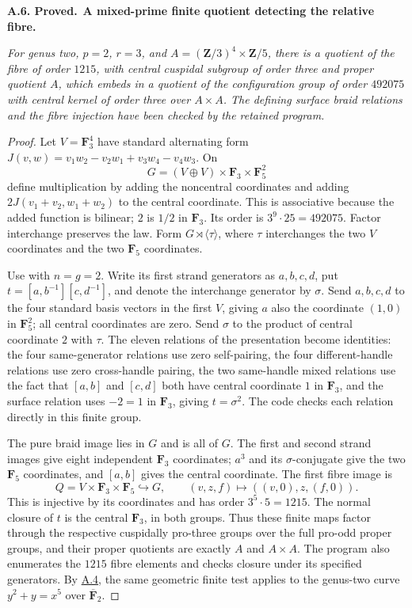 \documentclass[11pt,a4paper]{article}
\newcommand{\Z}{\mathbf Z}
\newcommand{\F}{\mathbf F}
\newenvironment{claim}[3]{\par\medskip\noindent\hypertarget{#1}{\textbf{#1. #2.}}\ \textbf{#3.}\par\nopagebreak\smallskip\begingroup\itshape}{\endgroup\par\smallskip}
\newcommand{\statementref}[1]{\hyperlink{#1}{#1}}
\begin{document}
\begin{claim}{A.6}{Proved}{A mixed-prime finite quotient detecting the relative fibre}
For genus two, $p=2$, $r=3$, and
$A=(\Z/3)^4\times\Z/5$, there is a quotient of the fibre of
order $1215$, with central cuspidal subgroup of order three and proper
quotient $A$, which embeds in a quotient of the configuration group of
order $492075$ with central kernel of order three over $A\times A$.
The defining surface braid relations and the fibre injection have been
checked by the retained program.
\end{claim}
\begin{proof}
Let $V=\F_3^4$ have standard alternating form
$J(v,w)=v_1w_2-v_2w_1+v_3w_4-v_4w_3$. On
\[
 G=(V\oplus V)\times\F_3\times\F_5^2
\]
define multiplication by adding the noncentral coordinates and adding
$2J(v_1+v_2,w_1+w_2)$ to the central coordinate. This is associative
because the added function is bilinear; $2$ is $1/2$ in $\F_3$.
Its order is $3^9\cdot25=492075$. Factor interchange preserves the
law. Form $G\rtimes\langle\tau\rangle$, where $\tau$ interchanges
the two $V$ coordinates and the two $\F_5$ coordinates.

Use \citet[Theorem 1.2]{Bellingeri2004} with $n=g=2$. Write its first
strand generators as $a,b,c,d$, put
$t=[a,b^{-1}][c,d^{-1}]$, and denote the interchange generator by
$\sigma$. Send $a,b,c,d$ to the four standard basis vectors in the
first $V$, giving $a$ also the coordinate $(1,0)$ in $\F_5^2$;
all central coordinates are zero. Send $\sigma$ to the product of
central coordinate $2$ with $\tau$. The eleven relations of the
presentation become identities: the four same-generator relations
use zero self-pairing, the four different-handle relations use zero
cross-handle pairing, the two same-handle mixed relations use the fact that
$[a,b]$ and $[c,d]$ both have central coordinate $1$ in $\F_3$,
and the surface relation
uses $-2=1$ in $\F_3$, giving $t=\sigma^2$.
The code checks each relation directly in this finite group.

The pure braid image lies in $G$ and is all of $G$. The first and
second strand images give eight independent $\F_3$ coordinates;
$a^3$ and its $\sigma$-conjugate give the two $\F_5$ coordinates,
and $[a,b]$ gives the central coordinate. The first fibre image is
\[
 Q=V\times\F_3\times\F_5\hookrightarrow G,
 \qquad (v,z,f)\longmapsto((v,0),z,(f,0)).
\]
This is injective by its coordinates and has order $3^5\cdot5=1215$.
The normal closure of $t$ is the central $\F_3$, in both groups.
Thus these finite maps factor through the respective cuspidally
pro-three groups over the full pro-odd proper groups, and their
proper quotients are exactly $A$ and $A\times A$. The program also
enumerates the $1215$ fibre elements and checks closure under its
specified generators. By \statementref{A.4}, the same geometric
finite test applies to the genus-two curve $y^2+y=x^5$ over
$\overline{\F}_2$.
\end{proof}
\end{document}
